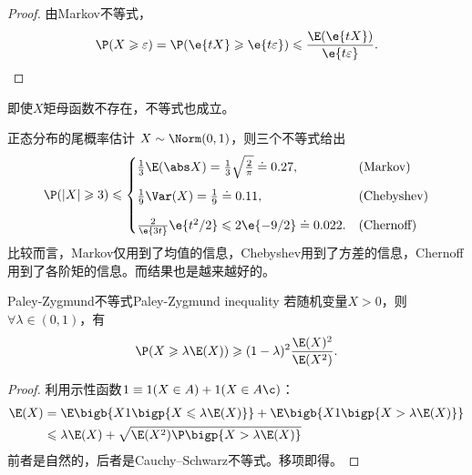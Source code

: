 \begin{proof}
	由Markov不等式，
	\[
		\P(X\geqslant\varepsilon)=\P(\e{tX}\geqslant\e{t\varepsilon})\leqslant\frac{\E(\e{tX})}{\e{t\varepsilon}}.
		\qedhere
	\]
\end{proof}
\begin{remark}
	即使$X$矩母函数不存在，不等式也成立。
\end{remark}

\begin{example}{正态分布的尾概率估计}{}
	$X\sim\Norm(0,1)$，则三个不等式给出
	\[
		\P(|X|\geqslant 3)\leqslant\begin{cases}
			\frac13\E(\abs X)=\frac13\sqrt{\frac2\pi}\doteq 0.27,&\text{(Markov)}\\[2ex]
			\frac19\Var(X)=\frac19\doteq 0.11,&\text{(Chebyshev)}\\[2ex]
			\frac{2}{\e{3t}}\e{t^2/2}\leqslant 2\e{-9/2}\doteq 0.022.&\text{(Chernoff)}
		\end{cases}
	\]
	比较而言，Markov仅用到了均值的信息，Chebyshev用到了方差的信息，Chernoff用到了各阶矩的信息。而结果也是越来越好的。
\end{example}

\begin{theorem}
	{Paley-Zygmund不等式}{Paley-Zygmund inequality}
	若随机变量$X>0$，则$\forall\lambda\in(0,1)$，有
	\begin{equation}
		\label{eqn:Paley-Zygmund ineq}
		\P(X\geqslant\lambda\E(X))\geqslant(1-\lambda)^2\frac{\E(X)^2}{\E(X^2)}.
	\end{equation}
\end{theorem}

\begin{proof}
	利用示性函数$1\equiv 1(X\in A)+1(X\in A\c)$：
	\begin{align*}
		\E(X)&=\E\bigb{X1\bigp{X\leqslant\lambda\E(X)}}+\E\bigb{X1\bigp{X>\lambda\E(X)}}\\
		&\leqslant\lambda\E(X)+\sqrt{\E(X^2)\P\bigp{X>\lambda\E(X)}}
	\end{align*}
	前者是自然的，后者是Cauchy–Schwarz不等式。移项即得。
\end{proof}

